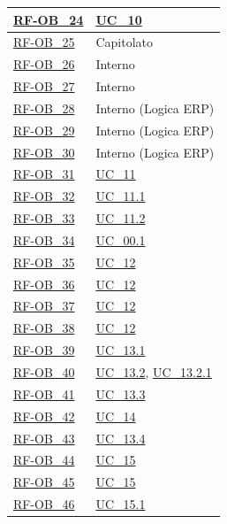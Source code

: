 \begin{longtable}{|>{\raggedright}p{}|>{\raggedright\arraybackslash}p{}|}
    \hyperlink{rf-ob_24}{RF-OB\_24} & \hyperref[uc_10]{UC\_10} \\ \hline
    \hyperlink{rf-ob_25}{RF-OB\_25} & Capitolato \\ \hline
    \hyperlink{rf-ob_26}{RF-OB\_26} & Interno \\ \hline
    \hyperlink{rf-ob_27}{RF-OB\_27} & Interno \\ \hline
    \hyperlink{rf-ob_28}{RF-OB\_28} & Interno (Logica ERP) \\ \hline
    \hyperlink{rf-ob_29}{RF-OB\_29} & Interno (Logica ERP) \\ \hline
    \hyperlink{rf-ob_30}{RF-OB\_30} & Interno (Logica ERP) \\ \hline
    \hyperlink{rf-ob_31}{RF-OB\_31} & \hyperref[uc_11]{UC\_11} \\ \hline
    \hyperlink{rf-ob_32}{RF-OB\_32} & \hyperref[uc_11.1]{UC\_11.1} \\ \hline
    \hyperlink{rf-ob_33}{RF-OB\_33} & \hyperref[uc_11.2]{UC\_11.2} \\ \hline
    \hyperlink{rf-ob_34}{RF-OB\_34} & \hyperref[uc_00.1]{UC\_00.1} \\ \hline
    \hyperlink{rf-ob_35}{RF-OB\_35} & \hyperref[uc_12]{UC\_12} \\ \hline
    \hyperlink{rf-ob_36}{RF-OB\_36} & \hyperref[uc_12]{UC\_12} \\ \hline
    \hyperlink{rf-ob_37}{RF-OB\_37} & \hyperref[uc_12]{UC\_12} \\ \hline
    \hyperlink{rf-ob_38}{RF-OB\_38} & \hyperref[uc_12]{UC\_12} \\ \hline
    \hyperlink{rf-ob_39}{RF-OB\_39} & \hyperref[uc_13.1]{UC\_13.1} \\ \hline
    \hyperlink{rf-ob_40}{RF-OB\_40} & \hyperref[uc_13.2]{UC\_13.2}, \hyperref[uc_13.2.1]{UC\_13.2.1} \\ \hline
    \hyperlink{rf-ob_41}{RF-OB\_41} & \hyperref[uc_13.3]{UC\_13.3} \\ \hline
    \hyperlink{rf-ob_42}{RF-OB\_42} & \hyperref[uc_14]{UC\_14} \\ \hline
    \hyperlink{rf-ob_43}{RF-OB\_43} & \hyperref[uc_13.4]{UC\_13.4} \\ \hline
    \hyperlink{rf-ob_44}{RF-OB\_44} & \hyperref[uc_15]{UC\_15} \\ \hline
    \hyperlink{rf-ob_45}{RF-OB\_45} & \hyperref[uc_15]{UC\_15} \\ \hline
    \hyperlink{rf-ob_46}{RF-OB\_46} & \hyperref[uc_15.1]{UC\_15.1} \\ \hline

\end{longtable}
